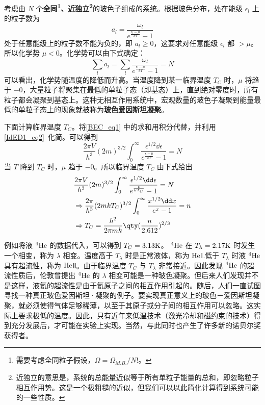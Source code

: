 

\begin{issues}
\issueDraft
\end{issues}


考虑由 $N$ 个\textbf{全同\footnote{需要考虑全同粒子假设，$\Omega=\Omega_{M.B.}/N!$。}、近独立\footnote{近独立的意思是，系统的总能量近似等于所有单粒子能量的总和，即忽略粒子相互作用势。这是一个极粗糙的近似，但我们可以以此简化计算得到系统可能的一些性质。}}的玻色子组成的系统。根据玻色分布，处在能级 $\epsilon_l$ 上的粒子数为
\begin{equation}
a_l=\frac{\omega_l}{e^{\frac{\epsilon_l-\mu}{kT}}-1}
\end{equation}
处于任意能级上的粒子数不能为负的，即 $a_l\ge 0$，这要求对任意能级 $\epsilon_l$ 都 $>\mu$。所以化学势 $\mu<0$。化学势可以由下式确定：
\begin{equation}\label{BEC_eq1}
\sum_la_l=\sum_l \frac{\omega_l}{e^{\frac{\epsilon_l-\mu}{kT}}-1} =N
\end{equation}
可以看出，化学势随温度的降低而升高。当温度降到某一临界温度 $T_C$ 时，$\mu$ 将趋于 $-0$，大量粒子将聚集在最低的单粒子态（即基态）上，直到绝对零度时，所有粒子都会凝聚到基态上。这种无相互作用系统中，宏观数量的玻色子凝聚到能量最低的单粒子态上的现象就被称为\textbf{玻色爱因斯坦凝聚}。

下面计算临界温度 $T_C$。将\autoref{BEC_eq1} 中的求和用积分代替，并利用\autoref{IdED1_eq2}~化简。可以得到
\begin{equation}
\frac{2\pi V}{h^3}(2m)^{3/2}\int_0^\infty \frac{\epsilon^{1/2}\dd \epsilon}{e^{\frac{\epsilon-\mu}{kT}}-1}=N
\end{equation}
当 $T$ 降到 $T_C$ 时，$\mu$ 趋于 $-0$。所以临界温度 $T_C$ 由下式给出
\begin{equation}\label{BEC_eq2}
\begin{aligned}
&\frac{2\pi V}{h^3}(2m)^{3/2}\int_0^\infty \frac{\epsilon^{1/2}\dd \epsilon}{e^{\frac{\epsilon}{kT_C}}-1}=N\\
&\Rightarrow \frac{2\pi}{h^3}(2mkT_C)^{3/2}\int_0^\infty \frac{x^{1/2}\dd x}{e^x-1}=n\\
&\Rightarrow T_C=\frac{h^2}{2\pi mk}\qty(\frac{n}{2.612})^{2/3}
\end{aligned}
\end{equation}

例如将液 $^4\rm{He}$ 的数据代入，可以得到 $T_C=3.13\rm{K}$。  $^4\rm{He}$ 在 $T_\lambda=2.17\rm{K}$ 时发生一个相变，称为 $\lambda$ 相变。温度高于 $T_\lambda$ 时是正常液体，称为 $\rm{He}$Ⅰ.低于 $T_\lambda$ 时液 $^4\rm{He}$ 具有超流性，称为 $\rm{He}$Ⅱ。由于临界温度 $T_C$ 与 $T_\lambda$ 非常接近。因此发现 $^4\rm{He}$ 的超流性质后，伦敦曾提出 $^4\rm{He}$ 的 $\lambda$ 相变可能是一种玻色凝聚。但后来人们发现并不是这样，液氦的超流性是由于氦原子之间的相互作用引起的。随后，人们一直试图寻找一种真正玻色爱因斯坦·凝聚的例子。要实现真正意义上的玻色－爱因斯坦凝聚，就必须使得气体足够稀薄，以至于其原子或分子间的相互作用可以忽略。这实际上要求极低的温度。因此，只有近年来低温技术（激光冷却和磁约束的技术）得到充分发展后，才可能在实验上实现。当然，与此同时也产生了许多新的诺贝尔奖获得者。

